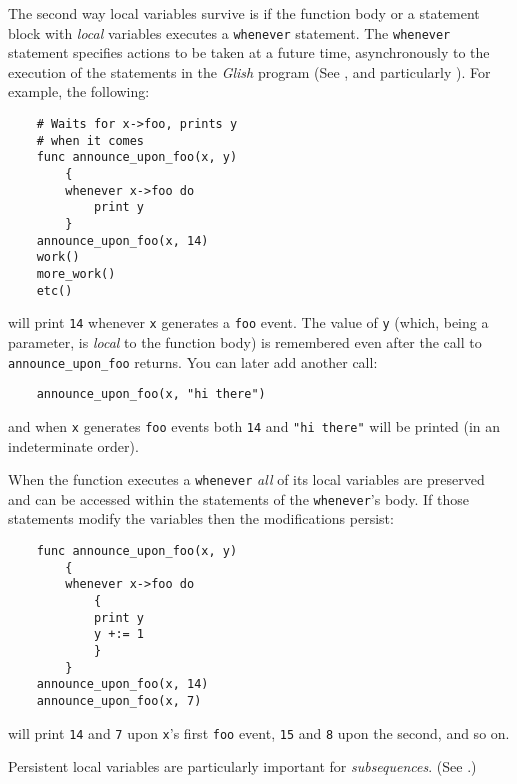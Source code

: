 \begin{sloppy}
The second way local variables survive is if the function body
or a statement block with {\em local} variables executes a {\tt whenever}
statement.  The {\tt whenever} statement specifies actions to be taken at
a future time, asynchronously to the execution of the statements in the
{\em Glish} program (See , and 
particularly ).
For example, the following:
\begin{verbatim}
    # Waits for x->foo, prints y
    # when it comes
    func announce_upon_foo(x, y)
        {
        whenever x->foo do
            print y
        }
    announce_upon_foo(x, 14)
    work()
    more_work()
    etc()
\end{verbatim}
will print {\tt 14} whenever {\tt x} generates a {\tt foo} event.
The value of {\tt y} (which, being a parameter, is {\em local} to
the function body) is remembered even after the call to {\tt
announce\_upon\_foo} returns.  You can later add another call:
\begin{verbatim}
    announce_upon_foo(x, "hi there")
\end{verbatim}
and when {\tt x} generates {\tt foo} events both {\tt 14} and {\tt "hi there"}
will be printed (in an indeterminate order).
\end{sloppy}

When the function executes a {\tt whenever} {\em all} of its local
variables are preserved and can be accessed within the statements
of the {\tt whenever}'s body.  If those statements modify the variables
then the modifications persist:
\begin{verbatim}
    func announce_upon_foo(x, y)
        {
        whenever x->foo do
            {
            print y
            y +:= 1
            }
        }
    announce_upon_foo(x, 14)
    announce_upon_foo(x, 7)
\end{verbatim}
will print {\tt 14} and {\tt 7} upon {\tt x}'s first {\tt foo} event,
{\tt 15} and {\tt 8} upon the second, and so on.

\begin{sloppy}
Persistent local variables are particularly important for {\em subsequences\/}.
(See .)
\end{sloppy}
